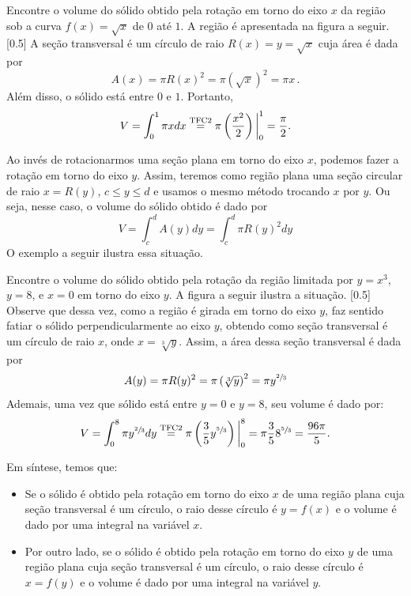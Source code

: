 \begin{example}
  Encontre o volume do sólido obtido pela
  rotação em torno do eixo $x$ da região sob a curva
  $f(x)= \sqrt{x}$ de $0$ até $1$.
  \solution
  A região é apresentada na figura a seguir.
  [0.5]
  A seção transversal é um círculo de raio
  $R(x) = y = \sqrt{x}$ cuja área é dada por
  \[
    A(x)
    = \pi R(x)^2
    = \pi \left(\sqrt{x}\right)^2
    = \pi x \,.
  \]
  Além disso, o sólido está entre $0$ e $1$. Portanto,
  \[
    V
    = \int_0^1 \pi x dx
    \stackrel{\text{\scriptsize TFC2}}{=} \pi \left( \frac{x^2}{2}\right) \bigg\rvert_{0}^{1}
    = \frac{\pi}{2}.
  \]
\end{example}

Ao invés de rotacionarmos uma seção plana em torno do eixo $x$, podemos fazer
a rotação em torno do eixo $y$. Assim, teremos como região plana uma seção
circular de raio $x=R(y)$, $c \leq y \leq d$ e usamos o mesmo método trocando
$x$ por $y$. Ou seja, nesse caso, o volume do sólido obtido é dado por
\[
  V
  = \int_c^d A(y)dy
  = \int_c^d \pi R(y)^2 dy
\]
O exemplo a seguir ilustra essa situação.

\begin{example}
  Encontre o volume do sólido obtido pela
  rotação da região limitada por $y = x^3$, $y = 8$, e $x = 0$
  em torno do eixo $y$.
  \solution
  A figura a seguir ilustra a situação.
  [0.5]
  Observe que dessa vez, como a região é girada em torno do eixo $y$, faz
  sentido fatiar o sólido perpendicularmente ao eixo $y$, obtendo como
  seção transversal é um círculo de raio $x$, onde $x= \sqrt[3]{y}$.
  Assim, a área dessa seção transversal é dada por
  \[
    A(y)
    = \pi R(y)^2
    = \pi \left( \sqrt[3]{y} \right)^2
    = \pi y^{\sfrac{2}{3}}
  \]
  Ademais, uma vez que sólido está entre $y = 0$ e $y = 8$, seu
  volume é dado por:
  \[
    V
    = \int_0^8 \pi y^{\sfrac{2}{3}}dy
    \stackrel{\text{\scriptsize TFC2}}{=} \pi \left( \frac{3}{5} y^{\sfrac{5}{3}}\right) \bigg\rvert_{0}^{8}
    = \pi \frac{3}{5} 8^{\sfrac{5}{3}}
    = \frac{96 \pi}{5}.
  \]
\end{example}

Em síntese, temos que:
\begin{itemize}
  \item Se o sólido é obtido pela rotação em torno do eixo $x$ de uma
  região plana cuja seção transversal é um círculo, o raio desse círculo
  é $y= f(x)$ e o volume é dado por uma integral na variável $x$.
  \item Por outro lado, se o sólido é obtido pela rotação em torno do
  eixo $y$ de uma região plana cuja seção transversal é um círculo, o
  raio desse círculo é $x= f(y)$ e o volume é dado por uma integral
  na variável $y$.
\end{itemize}

